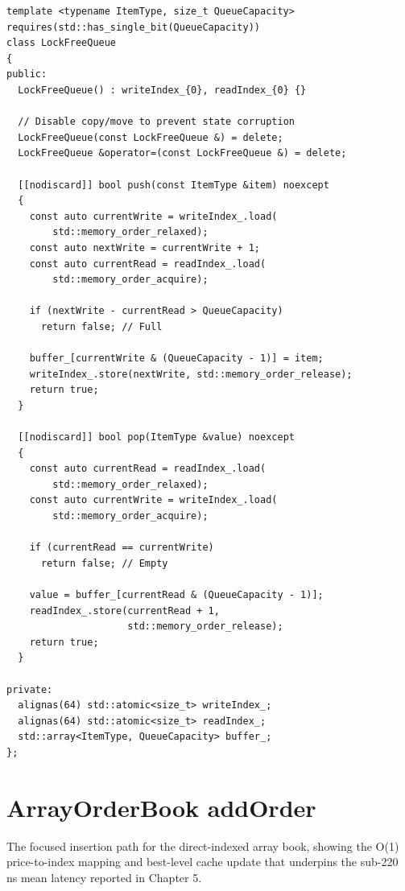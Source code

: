 \documentclass[12pt,a4paper]{report}
\begin{document}
\begin{lstlisting}[caption={Wait-Free SPSC Ring Buffer (src/utils/lock\_free\_queue.hpp)}]
template <typename ItemType, size_t QueueCapacity>
requires(std::has_single_bit(QueueCapacity))
class LockFreeQueue
{
public:
  LockFreeQueue() : writeIndex_{0}, readIndex_{0} {}

  // Disable copy/move to prevent state corruption
  LockFreeQueue(const LockFreeQueue &) = delete;
  LockFreeQueue &operator=(const LockFreeQueue &) = delete;

  [[nodiscard]] bool push(const ItemType &item) noexcept
  {
    const auto currentWrite = writeIndex_.load(
        std::memory_order_relaxed);
    const auto nextWrite = currentWrite + 1;
    const auto currentRead = readIndex_.load(
        std::memory_order_acquire);

    if (nextWrite - currentRead > QueueCapacity)
      return false; // Full

    buffer_[currentWrite & (QueueCapacity - 1)] = item;
    writeIndex_.store(nextWrite, std::memory_order_release);
    return true;
  }

  [[nodiscard]] bool pop(ItemType &value) noexcept
  {
    const auto currentRead = readIndex_.load(
        std::memory_order_relaxed);
    const auto currentWrite = writeIndex_.load(
        std::memory_order_acquire);

    if (currentRead == currentWrite)
      return false; // Empty

    value = buffer_[currentRead & (QueueCapacity - 1)];
    readIndex_.store(currentRead + 1,
                     std::memory_order_release);
    return true;
  }

private:
  alignas(64) std::atomic<size_t> writeIndex_;
  alignas(64) std::atomic<size_t> readIndex_;
  std::array<ItemType, QueueCapacity> buffer_;
};
\end{lstlisting}

\chapter{ArrayOrderBook addOrder}
The focused insertion path for the direct-indexed array book, showing the O(1) price-to-index mapping and best-level cache update that underpins the sub-220 ns mean latency reported in Chapter 5.
\end{document}
